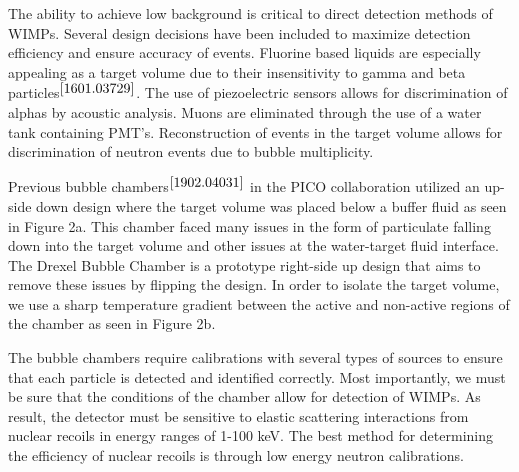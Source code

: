 \documentclass[%
12pt,
twoside,
reprint,
amsmath,amssymb,
aps,
]{article}
\begin{document}
	\par The ability to achieve low background is critical to direct detection methods of WIMPs. Several design decisions have been included to maximize detection efficiency and ensure accuracy of events. Fluorine based liquids are especially appealing as a target volume due to their insensitivity to gamma and beta particles$^{\cite{1601.03729}}$. The use of piezoelectric sensors allows for discrimination of alphas by acoustic analysis. Muons are eliminated through the use of a water tank containing PMT's. Reconstruction of events in the target volume allows for discrimination of neutron events due to bubble multiplicity. 
	\par Previous bubble chambers$^{\cite{1902.04031}}$ in the PICO collaboration utilized an up-side down design where the target volume was placed below a buffer fluid as seen in Figure 2a. This chamber faced many issues in the form of particulate falling down into the target volume and other issues at the water-target fluid interface. The Drexel Bubble Chamber is a prototype right-side up design that aims to remove these issues by flipping the design. In order to isolate the target volume, we use a sharp temperature gradient between the active and non-active regions of the chamber as seen in Figure 2b.
	\par The bubble chambers require calibrations with several types of sources to ensure that each particle is detected and identified correctly. Most importantly, we must be sure that the conditions of the chamber allow for detection of WIMPs. As result, the detector must be sensitive to elastic scattering interactions from nuclear recoils in energy ranges of 1-100 keV. The best method for determining the efficiency of nuclear recoils is through low energy neutron calibrations. 
	
\end{document}
